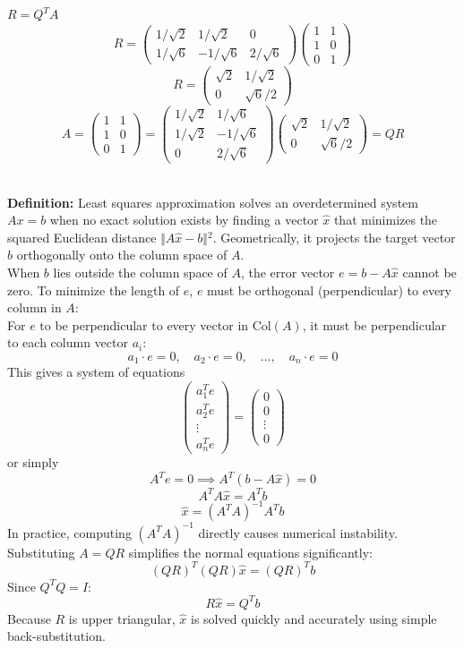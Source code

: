 \documentclass[DIV=20,oneside]{scrartcl}
\newcommand{\deff}{
	\noindent\textbf{\\Definition: }
}
\begin{document}
$R = Q^T A$
$$R = \begin{pmatrix} 1/\sqrt{2} & 1/\sqrt{2} & 0 \\ 1/\sqrt{6} & -1/\sqrt{6} & 2/\sqrt{6} \end{pmatrix} \begin{pmatrix} 1 & 1 \\ 1 & 0 \\ 0 & 1 \end{pmatrix}$$
$$R = \begin{pmatrix} \sqrt{2} & 1/\sqrt{2} \\ 0 & \sqrt{6}/2 \end{pmatrix}$$
$$A = \begin{pmatrix} 1 & 1 \\ 1 & 0 \\ 0 & 1 \end{pmatrix}=\begin{pmatrix} 1/\sqrt{2} & 1/\sqrt{6} \\ 1/\sqrt{2} & -1/\sqrt{6} \\ 0 & 2/\sqrt{6} \end{pmatrix}\begin{pmatrix} \sqrt{2} & 1/\sqrt{2} \\ 0 & \sqrt{6}/2 \end{pmatrix}=QR$$

\deff Least squares approximation solves an overdetermined system $Ax = b$ when no exact solution exists by finding a vector $\hat{x}$ that minimizes the squared Euclidean distance $\Vert{}A\hat{x} - b\Vert{}^2$. Geometrically, it projects the target vector $b$ orthogonally onto the column space of $A$.\\
When $b$ lies outside the column space of $A$, the error vector $e = b - A\hat{x}$ cannot be zero. To minimize the length of $e$, $e$ must be orthogonal (perpendicular) to every column in $A$:\\
For $e$ to be perpendicular to every vector in $\text{Col}(A)$, it must be perpendicular to each column vector $a_i$:$$a_1 \cdot e = 0, \quad a_2 \cdot e = 0, \quad \dots, \quad a_n \cdot e = 0$$
This gives a system of equations 
$$\begin{pmatrix} a_1^T e \\ a_2^T e \\ \vdots \\ a_n^T e \end{pmatrix} = \begin{pmatrix} 0 \\ 0 \\ \vdots \\ 0 \end{pmatrix}$$
or simply
$$A^T e = 0 \implies A^T (b - A\hat{x}) = 0$$
$$A^T A \hat{x} = A^T b$$
$$\hat{x} = (A^T A)^{-1} A^T b$$
In practice, computing $(A^T A)^{-1}$ directly causes numerical instability. Substituting $A = QR$ simplifies the normal equations significantly:
$$(QR)^T (QR) \hat{x} = (QR)^T b$$
Since $Q^T Q = I$:
$$R \hat{x} = Q^T b$$
Because $R$ is upper triangular, $\hat{x}$ is solved quickly and accurately using simple back-substitution.
\end{document}
